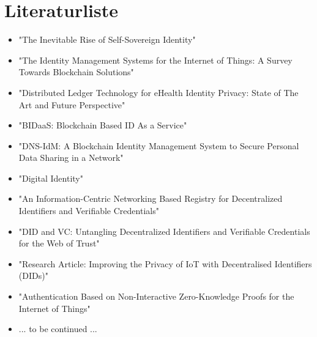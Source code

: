 \chapter{Literaturliste}

\begin{itemize}
	\item "The Inevitable Rise of Self-Sovereign Identity" \cite{SOV1}
	\item "The Identity Management Systems for the Internet of Things: A Survey Towards Blockchain Solutions" \cite{ID1}
	\item "Distributed Ledger Technology for eHealth Identity Privacy: State of The Art and Future Perspective" \cite{ID2}
	\item "BIDaaS: Blockchain Based ID As a Service" \cite{ID3}
	\item "DNS-IdM: A Blockchain Identity Management System to Secure Personal Data Sharing in a Network" \cite{ID4}
	\item "Digital Identity" \cite{ID5}
	\item "An Information-Centric Networking Based Registry for Decentralized Identifiers and Verifiable Credentials" \cite{ID6}
	\item "DID and VC:
	Untangling Decentralized Identifiers and Verifiable Credentials
	for the Web of Trust" \cite{ID7}
	\item "Research Article: Improving the Privacy of IoT with Decentralised Identifiers (DIDs)" \cite{ID8}
	\item "Authentication Based on Non-Interactive Zero-Knowledge Proofs for the Internet of Things" \cite{ID9}
	\item ... to be continued ...
\end{itemize}